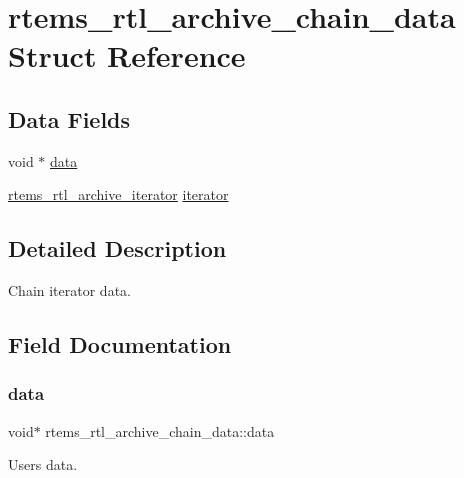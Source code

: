 \hypertarget{structrtems__rtl__archive__chain__data}{}\section{rtems\+\_\+rtl\+\_\+archive\+\_\+chain\+\_\+data Struct Reference}
\label{structrtems__rtl__archive__chain__data}
\subsection*{Data Fields}
\begin{DoxyCompactItemize}
\item 
void $\ast$ \mbox{\hyperlink{structrtems__rtl__archive__chain__data_afb97fe2854f5624b5e84bbdea20f1160}{data}}
\item 
\mbox{\hyperlink{rtl-archive_8c_a7f654505aadef94dfaca10b5cce047e4}{rtems\+\_\+rtl\+\_\+archive\+\_\+iterator}} \mbox{\hyperlink{structrtems__rtl__archive__chain__data_a0d614bc3213d4167d7bef97862241dca}{iterator}}
\end{DoxyCompactItemize}


\subsection{Detailed Description}
Chain iterator data. 

\subsection{Field Documentation}
\mbox{\label{structrtems__rtl__archive__chain__data_afb97fe2854f5624b5e84bbdea20f1160}} 
\subsubsection{\texorpdfstring{data}{data}}
{\footnotesize\ttfamily void$\ast$ rtems\+\_\+rtl\+\_\+archive\+\_\+chain\+\_\+data\+::data}

User\textquotesingle{}s data. \mbox{\label{structrtems__rtl__archive__chain__data_a0d614bc3213d4167d7bef97862241dca}} 
